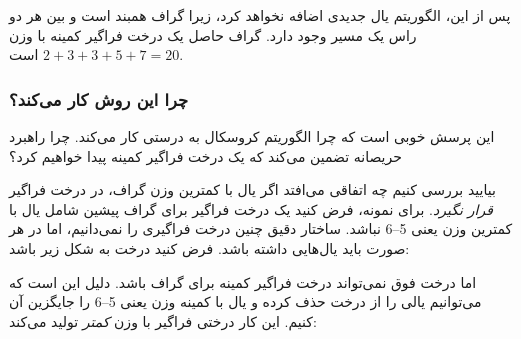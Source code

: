 پس از این، الگوریتم یال جدیدی اضافه نخواهد کرد، زیرا گراف همبند است
و بین هر دو راس یک مسیر وجود دارد.
گراف حاصل یک درخت فراگیر کمینه
با وزن $2+3+3+5+7=20$ است.

\subsubsection{چرا این روش کار می‌کند؟}

این پرسش خوبی است که چرا الگوریتم کروسکال به درستی کار می‌کند.
چرا راهبرد حریصانه تضمین می‌کند که
یک درخت فراگیر کمینه پیدا خواهیم کرد؟

بیایید بررسی کنیم چه اتفاقی می‌افتد اگر یال با کمترین وزن گراف،
در درخت فراگیر \emph{قرار نگیرد}.
برای نمونه، فرض کنید یک درخت فراگیر
برای گراف پیشین شامل یال با کمترین وزن یعنی 5--6 نباشد.
ساختار دقیق چنین درخت فراگیری را نمی‌دانیم،
اما در هر صورت باید یال‌هایی داشته باشد.
فرض کنید درخت به شکل زیر باشد:

\begin{center}
\end{center}

اما درخت فوق نمی‌تواند درخت فراگیر کمینه برای گراف باشد. دلیل این است که می‌توانیم یالی را از درخت حذف کرده و یال با کمینه وزن یعنی 5--6 را جایگزین آن کنیم. این کار درختی فراگیر با وزن \emph{کمتر} تولید می‌کند:

\begin{center}
\end{center}

